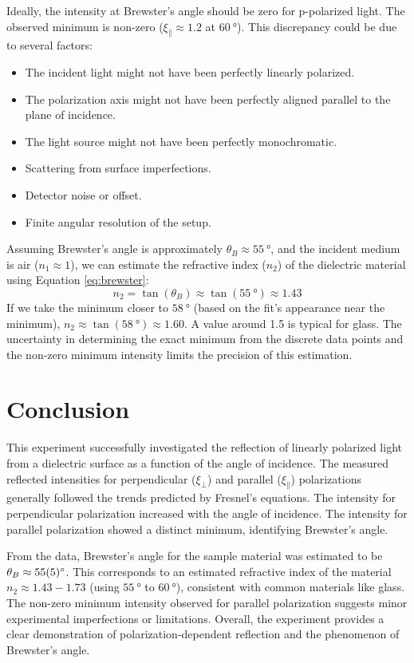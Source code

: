 \documentclass[journal]{IEEEtran}
\begin{document}
Ideally, the intensity at Brewster's angle should be zero for p-polarized light. The observed minimum is non-zero ($\xi_{\parallel} \approx 1.2$ at $\SI{60}{\degree}$). This discrepancy could be due to several factors:
\begin{itemize}
    \item The incident light might not have been perfectly linearly polarized.
    \item The polarization axis might not have been perfectly aligned parallel to the plane of incidence.
    \item The light source might not have been perfectly monochromatic.
    \item Scattering from surface imperfections.
    \item Detector noise or offset.
    \item Finite angular resolution of the setup.
\end{itemize}

Assuming Brewster's angle is approximately $\theta_B \approx \SI{55}{\degree}$, and the incident medium is air ($n_1 \approx 1$), we can estimate the refractive index ($n_2$) of the dielectric material using Equation \ref{eq:brewster}:
\begin{equation}
    n_2 = \tan(\theta_B) \approx \tan(\SI{55}{\degree}) \approx 1.43
\end{equation}
If we take the minimum closer to $\SI{58}{\degree}$ (based on the fit's appearance near the minimum), $n_2 \approx \tan(\SI{58}{\degree}) \approx 1.60$. A value around 1.5 is typical for glass. The uncertainty in determining the exact minimum from the discrete data points and the non-zero minimum intensity limits the precision of this estimation.

\section{Conclusion}
This experiment successfully investigated the reflection of linearly polarized light from a dielectric surface as a function of the angle of incidence. The measured reflected intensities for perpendicular ($\xi_{\perp}$) and parallel ($\xi_{\parallel}$) polarizations generally followed the trends predicted by Fresnel's equations. The intensity for perpendicular polarization increased with the angle of incidence. The intensity for parallel polarization showed a distinct minimum, identifying Brewster's angle.

From the data, Brewster's angle for the sample material was estimated to be $\theta_B \approx \SI{55 \pm 5}{\degree}$. This corresponds to an estimated refractive index of the material $n_2 \approx 1.43 - 1.73$ (using $\SI{55}{\degree}$ to $\SI{60}{\degree}$), consistent with common materials like glass. The non-zero minimum intensity observed for parallel polarization suggests minor experimental imperfections or limitations. Overall, the experiment provides a clear demonstration of polarization-dependent reflection and the phenomenon of Brewster's angle.
\end{document}
